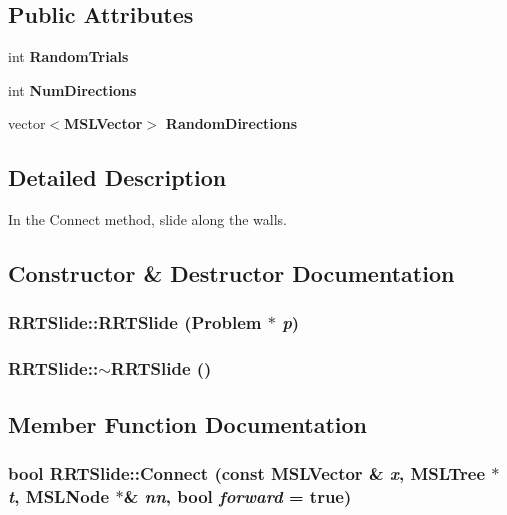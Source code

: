 \subsection*{Public Attributes}
\begin{CompactItemize}
\item 
int {\bf Random\-Trials}
\item 
int {\bf Num\-Directions}
\item 
vector$<${\bf MSLVector}$>$ {\bf Random\-Directions}
\end{CompactItemize}


\subsection{Detailed Description}
In the Connect method, slide along the walls.



\subsection{Constructor \& Destructor Documentation}
\subsubsection{\setlength{\rightskip}{0pt plus 5cm}RRTSlide::RRTSlide ({\bf Problem} $\ast$ {\em p})}\label{classRRTSlide_a0}


\subsubsection{\setlength{\rightskip}{0pt plus 5cm}RRTSlide::$\sim$RRTSlide ()\hspace{0.3cm}{\tt  [inline, virtual]}}\label{classRRTSlide_a1}




\subsection{Member Function Documentation}
\subsubsection{\setlength{\rightskip}{0pt plus 5cm}bool RRTSlide::Connect (const {\bf MSLVector} \& {\em x}, {\bf MSLTree} $\ast$ {\em t}, {\bf MSLNode} $\ast$\& {\em nn}, bool {\em forward} = true)\hspace{0.3cm}{\tt  [virtual]}}\label{classRRTSlide_a3}


